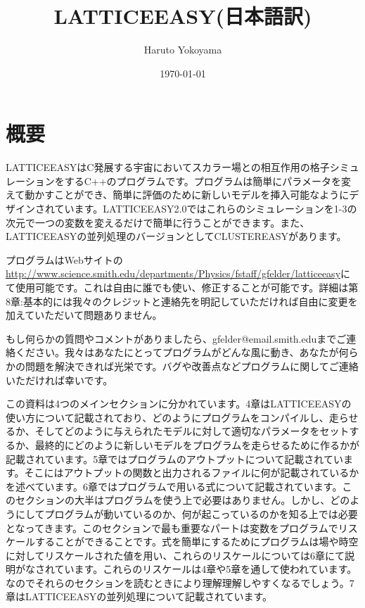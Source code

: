\documentclass[dvipdfmx,11pt,a4paper,report]{jsbook}
\title{LATTICEEASY(日本語訳)}
\author{Haruto Yokoyama}
\date{\today}
\begin{document}
\maketitle

\tableofcontents

\makeatletter
{}
\def\theequation{\thesection.\arabic{equation}}
\makeatother

\chapter{概要}
LATTICEEASYはC発展する宇宙においてスカラー場との相互作用の格子シミュレーションをするC++のプログラムです。プログラムは簡単にパラメータを変えて動かすことができ、簡単に評価のために新しいモデルを挿入可能なようにデザインされています。LATTICEEASY2.0ではこれらのシミュレーションを1-3の次元で一つの変数を変えるだけで簡単に行うことができます。また、LATTICEEASYの並列処理のバージョンとしてCLUSTEREASYがあります。

プログラムはWebサイトの\url{http://www.science.smith.edu/departments/Physics/fstaff/gfelder/latticeeasy}にて使用可能です。これは自由に誰でも使い、修正することが可能です。詳細は第8章:基本的には我々のクレジットと連絡先を明記していただければ自由に変更を加えていただいて問題ありません。

もし何らかの質問やコメントがありましたら、gfelder@email.smith.eduまでご連絡ください。我々はあなたにとってプログラムがどんな風に動き、あなたが何らかの問題を解決できれば光栄です。バグや改善点などプログラムに関してご連絡いただければ幸いです。

この資料は4つのメインセクションに分かれています。4章はLATTICEEASYの使い方について記載されており、どのようにプログラムをコンパイルし、走らせるか、そしてどのように与えられたモデルに対して適切なパラメータをセットするか、最終的にどのように新しいモデルをプログラムを走らせるために作るかが記載されています。5章ではプログラムのアウトプットについて記載されています。そこにはアウトプットの関数と出力されるファイルに何が記載されているかを述べています。6章ではプログラムで用いる式について記載されています。このセクションの大半はプログラムを使う上で必要はありません。しかし、どのようにしてプログラムが動いているのか、何が起こっているのかを知る上では必要となってきます。このセクションで最も重要なパートは変数をプログラムでリスケールすることができることです。式を簡単にするためにプログラムは場や時空に対してリスケールされた値を用い、これらのリスケールについては6章にて説明がなされています。これらのリスケールは4章や5章を通して使われています。なのでそれらのセクションを読むときにより理解理解しやすくなるでしょう。7章はLATTICEEASYの並列処理について記載されています。
\end{document}

